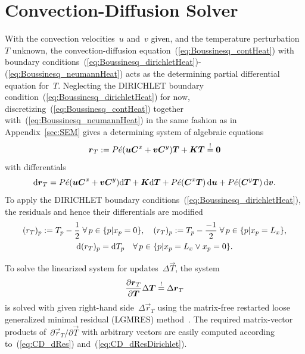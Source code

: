 \documentclass[10pt, ngerman, english,
twoside, open=right,
numbers=noenddot,
declaration=section,
abstract=section,
abstract=multiple,
abstract=notoc,
declaration=notoc,
cd=pale, 
chapterprefix=off, 
chapterpage=false, 
headingsvskip=-10em,
cdgeometry=custom, 
slantedgreek=on,
cdmath=on, 
cdfont=on,
ttfont=false,
mathswap=off,
]{tudscrreprt}
\numberwithin{equation}{chapter}
\renewcommand{\textsc}[1]{\uppercase{\mbox{#1}}}
\newcommand{\sidenote}[1]{
  \leavevmode %
  \marginpar{\hyphenpenalty=1000 \flushleft{\textcolor{HKS41}{#1}}}}
\begin{document}
\section{Convection-Diffusion Solver}\label{sec:Boussinesq_cd}
\sidenote{Discretization}With the convection velocities~$u$ and~$v$ given, and the temperature perturbation~$T$ unknown, the convection-diffusion equation~(\ref{eq:Boussinesq_contHeat}) with boundary conditions~\mbox{(\ref{eq:Boussinesq_dirichletHeat})-(\ref{eq:Boussinesq_neumannHeat})} acts as the determining partial differential equation for~$T$.
Neglecting the \textsc{Dirichlet} boundary condition~(\ref{eq:Boussinesq_dirichletHeat}) for now, discretizing~(\ref{eq:Boussinesq_contHeat}) together with~(\ref{eq:Boussinesq_neumannHeat}) in the same fashion as in Appendix~\ref{sec:SEM} gives a determining system of algebraic equations
\begin{equation}
\vec{r}_T := P\acute{e} \left( \vec{u} \mat C^x + \vec{v} \mat C^y  \right) \vec{T} + \mat K \vec{T} \overset!= \vec{0}\label{eq:CD_Res}
\end{equation}
with differentials
\begin{equation}
\d\vec{r}_T = P\acute{e} \left( \vec{u} \mat C^x + \vec{v} \mat C^y  \right) \d\vec{T} + \mat K \d\vec{T} + P\acute{e}\left( \mat C^x\vec{T} \right)\, \d\vec{u} + P\acute{e}\left( \mat C^y \vec{T} \right)\, \d\vec{v}\text{.}\label{eq:CD_dRes}
\end{equation}
To apply the \textsc{Dirichlet} boundary conditions~(\ref{eq:Boussinesq_dirichletHeat}), the residuals and hence their differentials are modified
\begin{subequations}\begin{gather}
(r_T)_p := T_p - \frac{1}{2}\; \forall\, p \in \lbrace p \vert x_p = 0 \rbrace,\quad (r_T)_p := T_p - \frac{-1}{2}\; \forall\, p \in \lbrace p \vert x_p = L_x \rbrace\text{,}\label{eq:CD_ResDirichlet}\\*
\mathrm{d}(r_T)_p = \mathrm{d} T_p\quad \forall\, p \in \lbrace p \vert x_p = L_x \vee x_p = 0 \rbrace\text{.}\label{eq:CD_dResDirichlet}
\end{gather}\end{subequations}\par
\sidenote{Solving}To solve the linearized system for updates~$\Delta \vec{T}$, the system
\begin{equation}
\pdiff{\vec{r}_T}{\vec{T}} \Delta\vec{T} \overset!= \Delta\vec{r}_T\label{eq:CD_inv}
\end{equation}
is solved with given right-hand side~$\Delta\vec{r}_T$ using the matrix-free restarted loose generalized minimal residual (LGMRES) method~\cite{LGMRES}. The required matrix-vector products of~$\partial\vec{r}_T/\partial\vec{T}$ with arbitrary vectors are easily computed according to~(\ref{eq:CD_dRes}) and~(\ref{eq:CD_dResDirichlet}).\par
\end{document}
